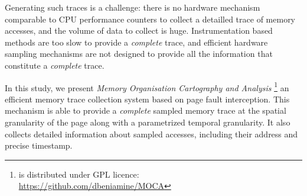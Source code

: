 Generating such traces is a challenge: there is no hardware mechanism
comparable to CPU performance counters to collect a detailled trace of memory accesses, and the volume
of data to collect is huge. Instrumentation based methods are too slow
to provide a \emph{complete} trace, and efficient hardware sampling mechanisms are not designed
to provide all the information that constitute a \emph{complete} trace.

In this study, we present \emph{Memory Organisation Cartography and Analysis}
\footnote{\Moca is distributed under GPL licence:\\
    \url{https://github.com/dbeniamine/MOCA}}
an efficient memory trace collection system based on page fault interception.
This mechanism is able to provide a \emph{complete} sampled memory trace at
the spatial granularity of the page along with a parametrized temporal granularity.
It also collects detailed information about sampled accesses, including their address and
precise timestamp.
